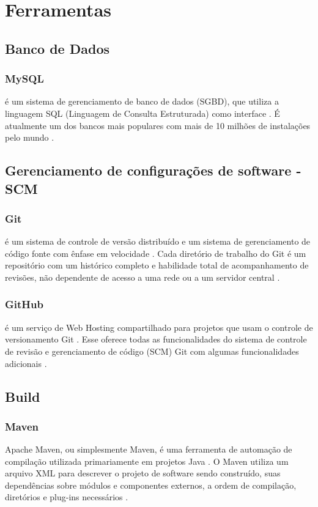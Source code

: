 \chapter{Ferramentas}

    \section{Banco de Dados}

	\subsection{MySQL} é um sistema de gerenciamento de banco de dados (SGBD),
	que utiliza a linguagem SQL (Linguagem de Consulta Estruturada) como
	interface \cite{mysql2001mysql}. É atualmente um dos bancos mais populares com mais de 10
	milhões de instalações pelo mundo \cite{delisle2006creating}.

    \section{Gerenciamento de configurações de software - SCM}

	\subsection{Git} é um sistema de controle de versão distribuído e um
	sistema de gerenciamento de código fonte com ênfase em velocidade \cite{loeliger2012version}.
	Cada diretório de trabalho do Git é um repositório com um histórico
	completo e habilidade total de acompanhamento de revisões, não
	dependente de acesso a uma rede ou a um servidor central \cite{somasundaram2013git}.

	\subsection{GitHub} é um serviço de Web Hosting compartilhado
	para projetos que usam o controle de versionamento Git \cite{ginnivanlatest}.
	Esse oferece todas as funcionalidades do sistema de controle de
	revisão e gerenciamento de código (SCM) Git com algumas
	funcionalidades adicionais \cite{longo2015use}.

    \section{Build}

	\subsection{Maven} Apache Maven, ou simplesmente Maven, é uma
	ferramenta de automação de compilação utilizada primariamente
	em projetos Java \cite{miller2010apache}. O Maven utiliza um arquivo XML para descrever
	o projeto de software sendo construído, suas dependências sobre
	módulos e componentes externos, a ordem de compilação,
	diretórios e plug-ins necessários \cite{porter2009apache}.

